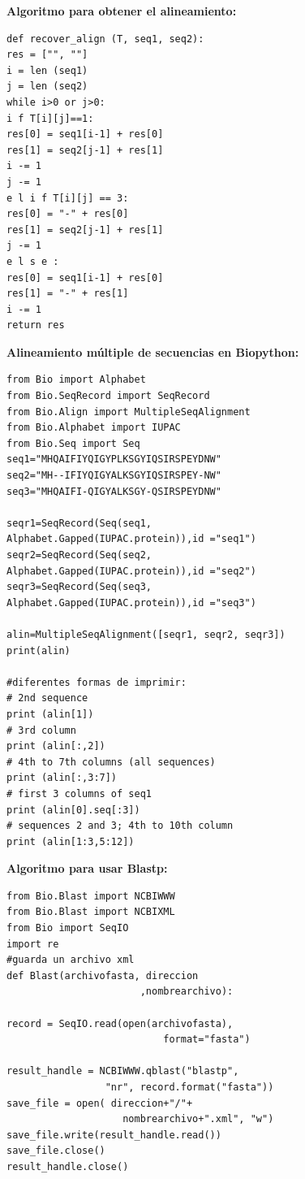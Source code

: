 \documentclass[twocolumn,twoside,12pt]{article}
\begin{document}
\textbf{Algoritmo para obtener el alineamiento:} \\
 \small
\begin{lstlisting}[frame=single]
def recover_align (T, seq1, seq2):
res = ["", ""]
i = len (seq1)
j = len (seq2)
while i>0 or j>0:
i f T[i][j]==1:
res[0] = seq1[i-1] + res[0]
res[1] = seq2[j-1] + res[1]
i -= 1
j -= 1
e l i f T[i][j] == 3:
res[0] = "-" + res[0]
res[1] = seq2[j-1] + res[1]
j -= 1
e l s e :
res[0] = seq1[i-1] + res[0]
res[1] = "-" + res[1]
i -= 1
return res

\end{lstlisting}
\normalsize
\textbf{Alineamiento m\'ultiple de secuencias en Biopython:}
\scriptsize
\begin{lstlisting}[frame=single]
from Bio import Alphabet
from Bio.SeqRecord import SeqRecord
from Bio.Align import MultipleSeqAlignment
from Bio.Alphabet import IUPAC
from Bio.Seq import Seq
seq1="MHQAIFIYQIGYPLKSGYIQSIRSPEYDNW"
seq2="MH--IFIYQIGYALKSGYIQSIRSPEY-NW"
seq3="MHQAIFI-QIGYALKSGY-QSIRSPEYDNW"

seqr1=SeqRecord(Seq(seq1,
Alphabet.Gapped(IUPAC.protein)),id ="seq1")
seqr2=SeqRecord(Seq(seq2,
Alphabet.Gapped(IUPAC.protein)),id ="seq2")
seqr3=SeqRecord(Seq(seq3,
Alphabet.Gapped(IUPAC.protein)),id ="seq3")
 
alin=MultipleSeqAlignment([seqr1, seqr2, seqr3])
print(alin)

#diferentes formas de imprimir:
# 2nd sequence
print (alin[1]) 
# 3rd column
print (alin[:,2]) 
# 4th to 7th columns (all sequences)
print (alin[:,3:7]) 
# first 3 columns of seq1
print (alin[0].seq[:3]) 
# sequences 2 and 3; 4th to 10th column
print (alin[1:3,5:12]) 

\end{lstlisting}	
\normalsize

\textbf{Algoritmo para usar Blastp:}\\
\scriptsize
\begin{lstlisting}[frame=single]
from Bio.Blast import NCBIWWW
from Bio.Blast import NCBIXML
from Bio import SeqIO
import re
#guarda un archivo xml
def Blast(archivofasta, direccion
                       ,nombrearchivo):
    
record = SeqIO.read(open(archivofasta),
                           format="fasta")

result_handle = NCBIWWW.qblast("blastp",
                 "nr", record.format("fasta"))
save_file = open( direccion+"/"+
                    nombrearchivo+".xml", "w")
save_file.write(result_handle.read())
save_file.close()
result_handle.close()

\end{lstlisting}	
\end{document}
